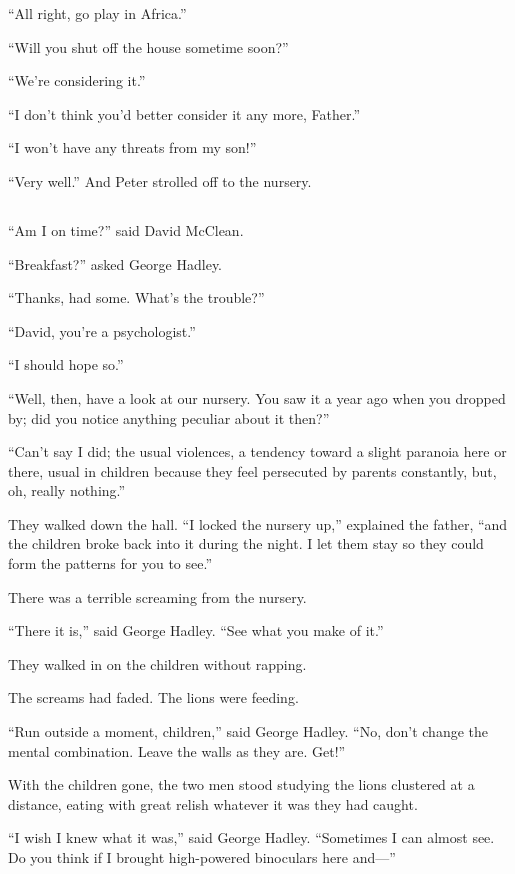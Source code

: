 \documentclass[10pt,a4paper]{article}
\begin{document}
“All right, go play in Africa.”

“Will you shut off the house sometime soon?”

“We’re considering it.”

“I don’t think you’d better consider it any more, Father.”

“I won’t have any threats from my son!”

“Very well.” And Peter strolled off to the nursery.

\subsection*{}

“Am I on time?” said David McClean.

“Breakfast?” asked George Hadley.

“Thanks, had some. What’s the trouble?”

“David, you’re a psychologist.”

“I should hope so.”

“Well, then, have a look at our nursery. You saw it a year ago when you dropped by; did you notice anything peculiar about it then?”

“Can’t say I did; the usual violences, a tendency toward a slight paranoia here or there, usual in children because they feel persecuted by parents constantly, but, oh, really nothing.”

They walked down the hall. “I locked the nursery up,” explained the father, “and the children broke back into it during the night. I let them stay so they could form the patterns for you to see.”

There was a terrible screaming from the nursery.

“There it is,” said George Hadley. “See what you make of it.”

They walked in on the children without rapping.

The screams had faded. The lions were feeding.

“Run outside a moment, children,” said George Hadley. “No, don’t change the mental combination. Leave the walls as they are. Get!”

With the children gone, the two men stood studying the lions clustered at a distance, eating with great relish whatever it was they had caught.

“I wish I knew what it was,” said George Hadley. “Sometimes I can almost see. Do you think if I brought high-powered binoculars here and—”
\end{document}
